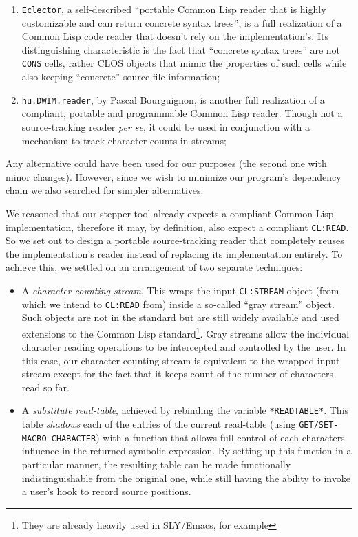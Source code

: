 \documentclass[sigconf]{acmart}
\begin{document}
\begin{enumerate}
\item \texttt{Eclector}\cite{eclector}, a self-described ``portable
  Common Lisp reader that is highly customizable and can return
  concrete syntax trees'', is a full realization of a Common Lisp code
  reader that doesn't rely on the implementation's.  Its
  distinguishing characteristic is the fact that ``concrete syntax
  trees'' are not \texttt{CONS} cells, rather CLOS objects that mimic
  the properties of such cells while also keeping ``concrete''
  source file information;

\item \texttt{hu.DWIM.reader}\cite{bourguignon-reader}, by Pascal
  Bourguignon, is another full realization of a compliant, portable
  and programmable Common Lisp reader.  Though not a source-tracking
  reader \emph{per se}, it could be used in conjunction with a
  mechanism to track character counts in streams;
\end{enumerate}

Any alternative could have been used for our purposes (the second one
with minor changes).  However, since we wish to minimize our program's
dependency chain we also searched for simpler alternatives.

We reasoned that our stepper tool already expects a compliant Common
Lisp implementation, therefore it may, by definition, also expect a
compliant \texttt{CL:READ}.  So we set out to design a portable
source-tracking reader that completely reuses the implementation's
reader instead of replacing its implementation entirely.  To achieve
this, we settled on an arrangement of two separate techniques:

\begin{itemize}
\item A \emph{character counting stream}.  This wraps the input
  \texttt{CL:STREAM} object (from which we intend to \texttt{CL:READ}
  from) inside a so-called ``gray stream'' object.  Such objects are
  not in the standard but are still widely available and used
  extensions to the Common Lisp standard\footnote{They are already
    heavily used in SLY/Emacs, for example}.  Gray streams allow the
  individual character reading operations to be intercepted and
  controlled by the user.  In this case, our character counting stream
  is equivalent to the wrapped input stream except for the fact that
  it keeps count of the number of characters read so far.
  
\item A \emph{substitute read-table}, achieved by rebinding the
  variable \texttt{*READTABLE*}.  This table \emph{shadows} each of
  the entries of the current read-table (using
  \texttt{GET/SET-MACRO-CHARACTER}) with a function that allows full
  control of each characters influence in the returned symbolic
  expression.  By setting up this function in a particular manner, the
  resulting table can be made functionally indistinguishable from the
  original one, while still having the ability to invoke a user's
  hook to record source positions.
\end{itemize}
\end{document}
